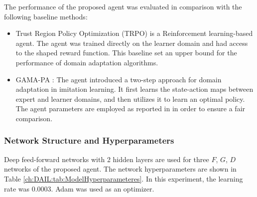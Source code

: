 The performance of the proposed \DAIL{} agent was evaluated in comparison with the following baseline methods:

\begin{itemize}
  \item
        Trust Region Policy Optimization (TRPO) \cite{RL_TRPO} is a Reinforcement learning-based agent.
        The agent was trained directly on the learner domain and had access to the shaped reward function.
        This baseline set an upper bound for the performance of domain adaptation algorithms.

  \item
        GAMA-PA \cite{DAIL_Model_DAIL}:
        The agent introduced a two-step approach for domain adaptation in imitation learning.
        It first learns the state-action maps between expert and learner domains, and then utilizes it to learn an optimal policy.
        The agent parameters are employed as reported in \cite{DAIL_Model_DAIL} in order to ensure a fair comparison.
\end{itemize}

\subsubsection{Network Structure and Hyperparameters}

Deep feed-forward networks with 2 hidden layers are used for three $F$, $G$, $D$ networks of the proposed agent.
The network hyperparameters are shown in Table \ref{ch:DAIL:tab:ModelHyperparameteres}.
In this experiment, the learning rate was 0.0003.
Adam was used as an optimizer.
